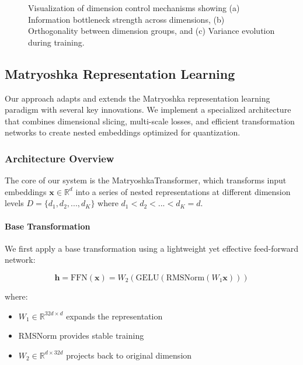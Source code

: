 \begin{figure}[h]
    \centering
    \caption{Visualization of dimension control mechanisms showing (a) Information bottleneck strength across dimensions, (b) Orthogonality between dimension groups, and (c) Variance evolution during training.}
    \label{fig:dimension_control}
\end{figure}


\subsection{Matryoshka Representation Learning}
\label{subsec:matryoshka}

Our approach adapts and extends the Matryoshka representation learning paradigm with several key innovations. We implement a specialized architecture that combines dimensional slicing, multi-scale losses, and efficient transformation networks to create nested embeddings optimized for quantization.

\subsubsection{Architecture Overview}

The core of our system is the MatryoshkaTransformer, which transforms input embeddings $\mathbf{x} \in \mathbb{R}^d$ into a series of nested representations at different dimension levels $D = \{d_1, d_2, ..., d_K\}$ where $d_1 < d_2 < ... < d_K = d$.

\paragraph{Base Transformation}
We first apply a base transformation using a lightweight yet effective feed-forward network:

\begin{equation}
    \mathbf{h} = \text{FFN}(\mathbf{x}) = W_2(\text{GELU}(\text{RMSNorm}(W_1\mathbf{x})))
\end{equation}

where:
\begin{itemize}
    \item $W_1 \in \mathbb{R}^{32d \times d}$ expands the representation
    \item RMSNorm provides stable training
    \item $W_2 \in \mathbb{R}^{d \times 32d}$ projects back to original dimension
\end{itemize}

